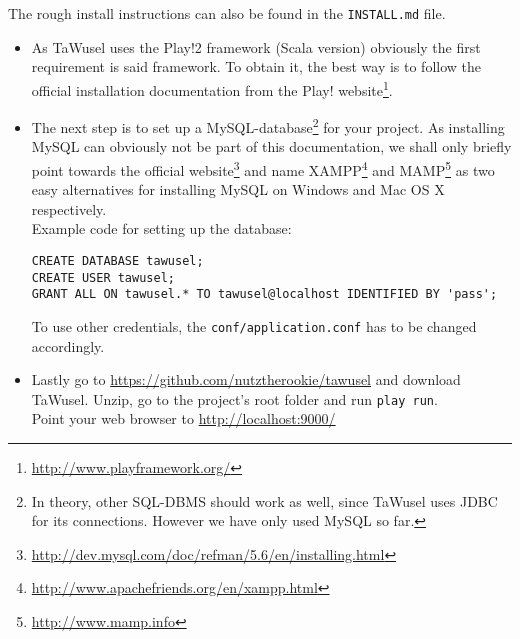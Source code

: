 The rough install instructions can also be found in the \texttt{INSTALL.md} file.
\begin{itemize}

\item As TaWusel uses the Play!2 framework (Scala version) obviously the first requirement is said framework. To obtain it, the
best way is to follow the official installation documentation from the Play!
website\footnote{\url{http://www.playframework.org/}}.

\item The next step is to set up a MySQL-database\footnote{In theory, other SQL-DBMS should work as well, since TaWusel uses
JDBC for its connections. However we have only used MySQL so far.} for your project.
As installing MySQL can obviously not be part of this documentation, we shall only briefly point towards the official
website\footnote{\url{http://dev.mysql.com/doc/refman/5.6/en/installing.html}} and name
XAMPP\footnote{\url{http://www.apachefriends.org/en/xampp.html}} and MAMP\footnote{\url{http://www.mamp.info}} as two easy
alternatives
for installing MySQL on Windows and Mac OS X respectively.\\
Example code for setting up the database:
\begin{verbatim}
CREATE DATABASE tawusel;
CREATE USER tawusel;
GRANT ALL ON tawusel.* TO tawusel@localhost IDENTIFIED BY 'pass';
\end{verbatim}
\small{To use other credentials, the \texttt{conf/application.conf} has to be changed accordingly.}

\item Lastly go to \url{https://github.com/nutztherookie/tawusel} and download TaWusel. Unzip, go to the project's root folder and
run \texttt{play run}.\\
Point your web browser to \url{http://localhost:9000/}


\end{itemize}